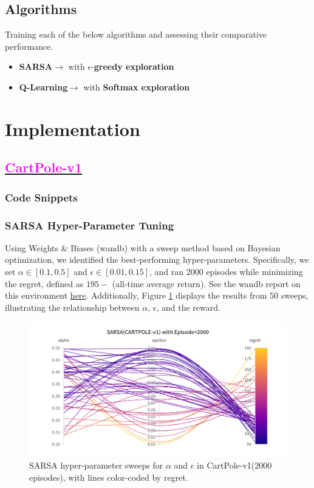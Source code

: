 \documentclass[11pt, a4]{article}
\begin{document}
		\subsection{Algorithms}
		Training each of the below algorithms and assessing their comparative performance.
		\begin{itemize}
			\item \textbf{SARSA}$\rightarrow$ with $\epsilon$-\textbf{greedy exploration}
			\item \textbf{Q-Learning}$\rightarrow$ with \textbf{Softmax exploration}
		\end{itemize}
	\section{Implementation}
		\subsection{\href{https://github.com/RitabrataMandal/RL-DA6400-assignment_1/tree/main/cartpole-v1}{\textcolor{magenta}{CartPole-v1}}}
			\subsubsection{Code Snippets}
%				
			\subsubsection{SARSA Hyper-Parameter Tuning}  
			Using Weights \& Biases (wandb) with a sweep method based on Bayesian optimization, we identified the best-performing hyper-parameters. Specifically, we set $\alpha \in [0.1, 0.5]$ and $\epsilon \in [0.01, 0.15]$, and ran 2000 episodes while minimizing the regret, defined as \(195 -\) (all-time average return). See the wandb report on this environment \href{https://api.wandb.ai/links/ee24e009-iitm/0hseqrps}{here}. Additionally, Figure \ref{fig:sarsacartpole-regret} displays the results from 50 sweeps, illustrating the relationship between $\alpha$, $\epsilon$, and the reward.
				\begin{figure}[H]
					\centering
					\includegraphics[width=1\linewidth]{sarsa-hyp-tuning-cartpole.png}
					\caption{SARSA hyper-parameter sweeps for $\alpha$ and $\epsilon$ in CartPole-v1(2000 episodes), with lines color-coded by regret.}
					\label{fig:sarsacartpole-regret}
				\end{figure}
\end{document}
